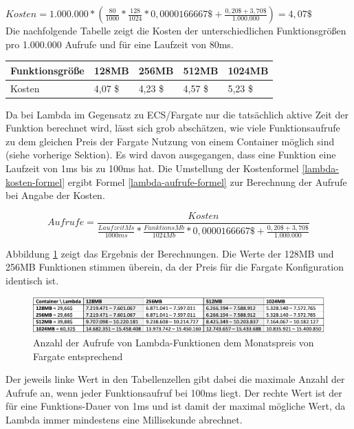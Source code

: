 \noindent
$Kosten = 1.000.000 * \left(\frac{80}{1000}*\frac{128}{1024} * 0,0000166667\$ + \frac{0,20\$ + 3,70\$}{1.000.000}\right) = 4,07\$$ \\

Die nachfolgende Tabelle zeigt die Kosten der unterschiedlichen Funktionsgrößen pro 1.000.000 Aufrufe und für eine Laufzeit von 80ms.

\begin{table}[H]
\label{lambda-kosten-70ms-1000000aufrufe}
\begin{tabular}{lllll}
\hline
Funktionsgröße & 128MB   & 256MB   & 512MB   & 1024MB  \\ \hline
Kosten         & 4,07 \$ & 4,23 \$ & 4,57 \$ & 5,23 \$ \\ \hline
\end{tabular}
\end{table}

Da bei Lambda im  Gegensatz zu ECS/Fargate nur die tatsächlich aktive Zeit der Funktion berechnet wird, lässt sich grob abschätzen, wie viele Funktionsaufrufe zu dem gleichen Preis der Fargate Nutzung von einem Container möglich sind (siehe vorherige Sektion). Es wird davon ausgegangen, dass eine Funktion eine Laufzeit von 1ms bis zu 100ms hat. Die Umstellung der Kostenformel \ref{lambda-kosten-formel} ergibt Formel \ref{lambda-aufrufe-formel} zur Berechnung der Aufrufe bei Angabe der Kosten.

\begin{equation}
\label{lambda-aufrufe-formel}
Aufrufe = \frac{Kosten}{\frac{LaufzeitMs}{1000ms} * \frac{FunktionsMb}{1024Mb} * 0,0000166667\$ + \frac{0,20\$ + 3,70\$}{1.000.000}}
\end{equation}

Abbildung \ref{fig:lambda-max-invocations} zeigt das Ergebnis der Berechnungen. Die Werte der 128MB und 256MB Funktionen stimmen überein, da der Preis für die Fargate Konfiguration identisch ist.

\begin{figure}[H]
    \includegraphics[width=\textwidth]{img/lambda-max-invocations.png}
    \caption[Anzahl der Aufrufe von Lambda-Funktionen dem Monatspreis von Fargate entsprechend]{Anzahl der Aufrufe von Lambda-Funktionen dem Monatspreis von Fargate entsprechend}
    \label{fig:lambda-max-invocations}
\end{figure}

Der jeweils linke Wert in den Tabellenzellen gibt dabei die maximale Anzahl der Aufrufe an, wenn jeder Funktionsaufruf bei 100ms liegt. Der rechte Wert ist der für eine Funktions-Dauer von 1ms und ist damit der maximal mögliche Wert, da Lambda immer mindestens eine Millisekunde abrechnet\cite{noauthor_lambda_nodate}.